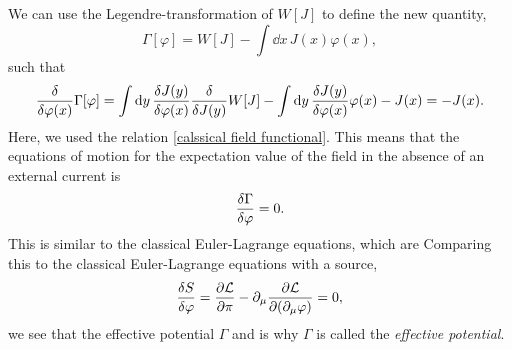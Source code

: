 
We can use the Legendre-transformation of $W[J]$ to define the new quantity,
\begin{equation}
    \Gamma[\varphi]
    = W[J] - \int \dd x \, J(x) \varphi(x), 
\end{equation}
such that
\begin{equation}
    \fdv{\varphi(x)} \Gamma[\varphi]
    = \int \dd y \, \fdv{J(y)}{\varphi(x)} \fdv{J(y)} W[J]
    - \int \dd y \, \fdv{J(y)}{\varphi(x)} \varphi(x)
    - J(x)
    = - J(x).
\end{equation}
Here, we used the relation \autoref{calssical field functional}.
This means that the equations of motion for the expectation value of the field in the absence of an external current is
\begin{equation}
    \fdv{\Gamma}{\varphi} = 0.
\end{equation}
This is similar to the classical Euler-Lagrange equations, which are
Comparing this to the classical Euler-Lagrange equations with a source,
\begin{equation}
    \fdv{S}{\varphi} = \pdv{\Ell}{\pi} - \partial_\mu \pdv{\Ell}{(\partial_\mu \varphi)} = 0,
\end{equation}
we see that the effective potential $\Gamma$
and is why $\Gamma$ is called the \emph{effective potential}.

